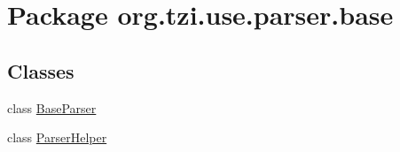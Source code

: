 \hypertarget{namespaceorg_1_1tzi_1_1use_1_1parser_1_1base}{\section{Package org.\-tzi.\-use.\-parser.\-base}
\label{namespaceorg_1_1tzi_1_1use_1_1parser_1_1base}
}
\subsection*{Classes}
\begin{DoxyCompactItemize}
\item 
class \hyperlink{classorg_1_1tzi_1_1use_1_1parser_1_1base_1_1_base_parser}{Base\-Parser}
\item 
class \hyperlink{classorg_1_1tzi_1_1use_1_1parser_1_1base_1_1_parser_helper}{Parser\-Helper}
\end{DoxyCompactItemize}
